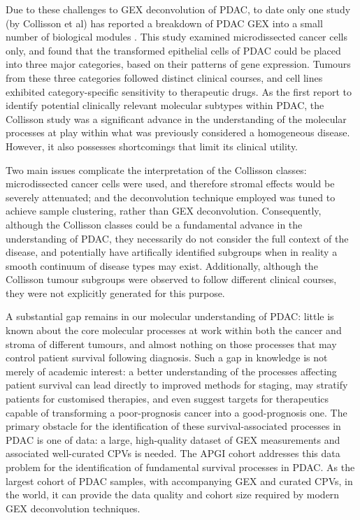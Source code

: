\documentclass[dissertation.tex]{subfiles}
\begin{document}
Due to these challenges to \gls{GEX} deconvolution of \gls{PDAC}, to date only one study (by Collisson et al) has reported a breakdown of \gls{PDAC} \gls{GEX} into a small number of biological modules \cite{Collisson2011}.  This study examined microdissected cancer cells only, and found that the transformed epithelial cells of \gls{PDAC} could be placed into three major categories, based on their patterns of gene expression.  Tumours from these three categories followed distinct clinical courses, and cell lines exhibited category-specific sensitivity to therapeutic drugs.  As the first report to identify potential clinically relevant molecular subtypes within \gls{PDAC}, the Collisson study was a significant advance in the understanding of the molecular processes at play within what was previously considered a homogeneous disease.  However, it also possesses shortcomings that limit its clinical utility.

Two main issues complicate the interpretation of the Collisson classes: microdissected cancer cells were used, and therefore stromal effects would be severely attenuated; and the deconvolution technique employed was tuned to achieve sample clustering, rather than \gls{GEX} deconvolution.  Consequently, although the Collisson classes could be a fundamental advance in the understanding of \gls{PDAC}, they necessarily do not consider the full context of the disease, and potentially have artifically identified subgroups when in reality a smooth continuum of disease types may exist.  Additionally, although the Collisson tumour subgroups were observed to follow different clinical courses, they were not explicitly generated for this purpose. 

A substantial gap remains in our molecular understanding of \gls{PDAC}: little is known about the core molecular processes at work within both the cancer and stroma of different tumours, and almost nothing on those processes that may control patient survival following diagnosis.  Such a gap in knowledge is not merely of academic interest: a better understanding of the processes affecting patient survival can lead directly to improved methods for staging, may stratify patients for customised therapies, and even suggest targets for therapeutics capable of transforming a poor-prognosis cancer into a good-prognosis one.  The primary obstacle for the identification of these survival-associated processes in \gls{PDAC} is one of data: a large, high-quality dataset of \gls{GEX} measurements and associated well-curated \glspl{CPV} is needed.  The \gls{APGI} cohort addresses this data problem for the identification of fundamental survival processes in \gls{PDAC}.  As the largest cohort of \gls{PDAC} samples, with accompanying \gls{GEX} and curated \glspl{CPV}, in the world, it can provide the data quality and cohort size required by modern \gls{GEX} deconvolution techniques.
\end{document}
